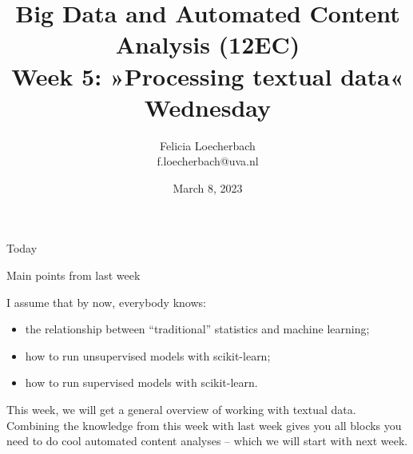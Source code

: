 \documentclass[compress]{beamer}
\begin{document}
\title[Big Data and Automated Content Analysis]{\textbf{Big Data and Automated Content Analysis (12EC)} 
\\Week 5: »Processing textual data«
\\Wednesday}
\author[Felicia Loecherbach]{Felicia Loecherbach\\ \footnotesize{f.loecherbach@uva.nl\\}}
\date{March 8, 2023}


\begin{frame}{}
	\titlepage
\end{frame}

\begin{frame}{Today}
	\tableofcontents
\end{frame}





\begin{frame}{Main points from last week}

\begin{alertblock}{I assume that by now, everybody knows:}
\begin{itemize}
\item the relationship between ``traditional'' statistics and machine learning;
\item how to run unsupervised models with scikit-learn;
\item how to run supervised models with scikit-learn.
\end{itemize}
\end{alertblock}
\end{frame}


\begin{frame}[standout]
This week, we will get a general overview of working with textual data. Combining the knowledge from this week with last week gives you all blocks you need to do cool automated content analyses -- which we will start with next week.
\end{frame}







\end{document}
